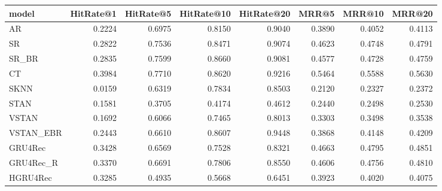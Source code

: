 \begin{tabular}{lrrrrrrr}
\toprule
     model &  HitRate@1 &  HitRate@5 &  HitRate@10 &  HitRate@20 &   MRR@5 &  MRR@10 &  MRR@20 \\
\midrule
        AR &     0.2224 &     0.6975 &      0.8150 &      0.9040 &  0.3890 &  0.4052 &  0.4113 \\
        SR &     0.2822 &     0.7536 &      0.8471 &      0.9074 &  0.4623 &  0.4748 &  0.4791 \\
     SR\_BR &     0.2835 &     0.7599 &      0.8660 &      0.9081 &  0.4577 &  0.4728 &  0.4759 \\
        CT &     0.3984 &     0.7710 &      0.8620 &      0.9216 &  0.5464 &  0.5588 &  0.5630 \\
      SKNN &     0.0159 &     0.6319 &      0.7834 &      0.8503 &  0.2120 &  0.2327 &  0.2372 \\
      STAN &     0.1581 &     0.3705 &      0.4174 &      0.4612 &  0.2440 &  0.2498 &  0.2530 \\
     VSTAN &     0.1692 &     0.6066 &      0.7465 &      0.8013 &  0.3303 &  0.3498 &  0.3538 \\
 VSTAN\_EBR &     0.2443 &     0.6610 &      0.8607 &      0.9448 &  0.3868 &  0.4148 &  0.4209 \\
   GRU4Rec &     0.3428 &     0.6569 &      0.7528 &      0.8321 &  0.4663 &  0.4795 &  0.4851 \\
 GRU4Rec\_R &     0.3370 &     0.6691 &      0.7806 &      0.8550 &  0.4606 &  0.4756 &  0.4810 \\
  HGRU4Rec &     0.3285 &     0.4935 &      0.5668 &      0.6451 &  0.3923 &  0.4020 &  0.4075 \\
\bottomrule
\end{tabular}
